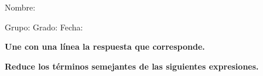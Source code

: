 \documentclass[12pt,addpoints]{exam}
\begin{document}
%

Nombre:\enspace\hrulefill

\vspace{5mm}

Grupo:\enspace\hrulefill
\enspace{}Grado:\enspace\hrulefill
\enspace{}Fecha:\enspace\hrulefill

\begin{questions}

\begin{EnvFullwidth}
  \sffamily\textbf{Une con una línea la respuesta que corresponde.}
\end{EnvFullwidth}



\begin{EnvFullwidth}
  \sffamily\textbf{Reduce los términos semejantes de las siguientes
  expresiones.}
\end{EnvFullwidth}


\vspace{\baselineskip}


\vspace{\baselineskip}


\vspace{\baselineskip}


\vspace{\baselineskip}



\end{questions}
\end{document}
